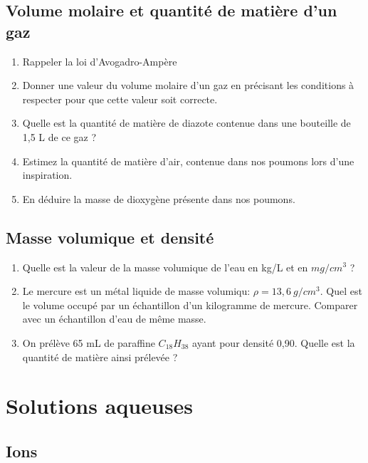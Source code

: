 \documentclass[
]{book}
\providecommand{\tightlist}{%
  \setlength{\itemsep}{0pt}\setlength{\parskip}{0pt}}
\def\tightlist{}
\begin{document}
\hypertarget{volume-molaire-et-quantituxe9-de-matiuxe8re-dun-gaz}{%
\subsection{Volume molaire et quantité de matière d'un gaz}\label{volume-molaire-et-quantituxe9-de-matiuxe8re-dun-gaz}}

\begin{enumerate}
\def\labelenumi{\arabic{enumi}.}
\tightlist
\item
  Rappeler la loi d'Avogadro-Ampère
\item
  Donner une valeur du volume molaire d'un gaz en précisant les conditions à respecter pour que cette valeur soit correcte.
\item
  Quelle est la quantité de matière de diazote contenue dans une bouteille de 1,5 L de ce gaz ?
\item
  Estimez la quantité de matière d'air, contenue dans nos poumons lors d'une inspiration.
\item
  En déduire la masse de dioxygène présente dans nos poumons.
\end{enumerate}

\hypertarget{masse-volumique-et-densituxe9}{%
\subsection{Masse volumique et densité}\label{masse-volumique-et-densituxe9}}

\begin{enumerate}
\def\labelenumi{\arabic{enumi}.}
\tightlist
\item
  Quelle est la valeur de la masse volumique de l'eau en kg/L et en \(mg/cm^3\) ?
\item
  Le mercure est un métal liquide de masse volumiqu: \(\rho= 13,6\:g/cm^3\). Quel est le volume occupé par un échantillon d'un kilogramme de mercure. Comparer avec un échantillon d'eau de même masse.
\item
  On prélève 65 mL de paraffine \(C_{18}H_{38}\) ayant pour densité 0,90. Quelle est la quantité de matière ainsi prélevée ?
\end{enumerate}

\hypertarget{solutions-aqueuses}{%
\section{Solutions aqueuses}\label{solutions-aqueuses}}

\hypertarget{ions}{%
\subsection{Ions}\label{ions}}
\end{document}
